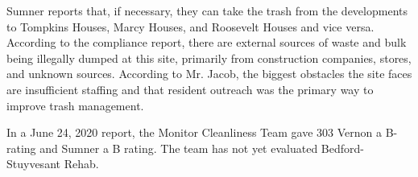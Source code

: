 Sumner reports that, if necessary, they can take the trash from the developments to Tompkins Houses, Marcy Houses, and Roosevelt Houses and vice versa. According to the compliance report, there are external sources of waste and bulk being illegally dumped at this site, primarily from construction companies, stores, and unknown sources. According to Mr. Jacob, the biggest obstacles the site faces are insufficient staffing and that resident outreach was the primary way to improve trash management. 

In a June 24, 2020 report, the Monitor Cleanliness Team gave 303 Vernon a B- rating and Sumner a B rating. The team has not yet evaluated Bedford-Stuyvesant Rehab.  
